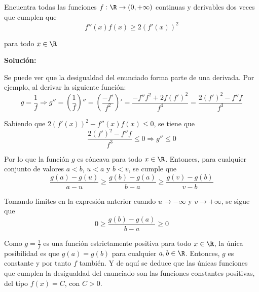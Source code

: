 \documentclass[../../main.tex]{subfiles}
\begin{document}
  \begin{shaded}
    Encuentra todas las funciones $f: \R \to (0, + \infty)$ continuas y derivables dos veces que cumplen que
    $$
    f''(x) f(x) \geq 2 (f'(x))^2
    $$

    para todo $x \in \R$
  \end{shaded}

  \textbf{Solución:}

  Se puede ver que la desigualdad del enunciado forma parte de una derivada. Por ejemplo, al derivar la siguiente función:
  $$
  g = \frac{1}{f} \Longrightarrow g'' = \left(\frac{1}{f}\right)'' = \left(\frac{-f'}{f^2}\right)' = \frac{-f'' f^2 + 2 f (f')^2}{f^4} = \frac{2 (f')^2 -f'' f}{f^3}
  $$

  Sabiendo que $ 2 (f'(x))^2 - f''(x) f(x) \leq 0$, se tiene que
  $$
  \frac{2 (f')^2 -f'' f}{f^3} \leq 0 \Longrightarrow g'' \leq 0
  $$

  Por lo que la función $g$ es cóncava para todo $x \in \R$. Entonces, para cualquier conjunto de valores $a < b$, $u < a$ y $b < v$, se cumple que
  $$
  \frac{g(a) - g(u)}{a - u} \geq \frac{g(b) - g(a)}{b - a} \geq \frac{g(v) - g(b)}{v - b}
  $$

  Tomando límites en la expresión anterior cuando $u \to - \infty$ y $v \to + \infty$, se sigue que
  $$
  0 \geq \frac{g(b) - g(a)}{b - a} \geq 0
  $$

  Como $g = \displaystyle\frac{1}{f}$ es una función estrictamente positiva para todo $x \in \R$, la única posibilidad es que $g(a) = g(b)$ para cualquier $a, b \in \R$. Entonces, $g$ es constante y por tanto $f$ también. Y de aquí se deduce que las únicas funciones que cumplen la desigualdad del enunciado son las funciones constantes positivas, del tipo $f(x) = C$, con $C > 0$.
\end{document}
